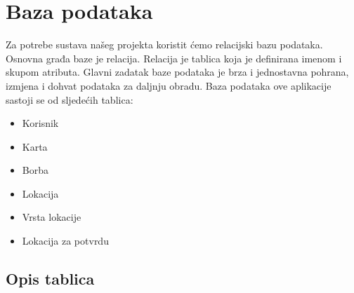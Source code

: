 		\section{Baza podataka}
			
			
			Za potrebe sustava našeg projekta koristit ćemo relacijski bazu podataka. Osnovna građa baze je relacija. Relacija je tablica koja je definirana imenom i skupom atributa. Glavni zadatak baze podataka je brza i jednostavna pohrana, izmjena i dohvat podataka za daljnju obradu.
			Baza podataka ove aplikacije sastoji se od sljedećih tablica: 
			\begin{itemize}
				\item Korisnik
				\item Karta
				\item Borba
				\item Lokacija
				\item Vrsta lokacije
				\item Lokacija za potvrdu
			\end{itemize}
		
			\subsection{Opis tablica}
			

				
